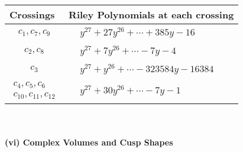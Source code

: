\documentclass[1p]{elsarticle_modified}
\theoremstyle{definition}
\begin{document}
\begin{tabular}{m{50pt}|m{274pt}}
Crossings & \hspace{64pt}Riley Polynomials at each crossing \\
\hline $$\begin{aligned}c_{1},c_{7},c_{9}\end{aligned}$$&$\begin{aligned}
&y^{27}+27 y^{26}+\cdots+385 y-16
\end{aligned}$\\
\hline $$\begin{aligned}c_{2},c_{8}\end{aligned}$$&$\begin{aligned}
&y^{27}+7 y^{26}+\cdots-7 y-4
\end{aligned}$\\
\hline $$\begin{aligned}c_{3}\end{aligned}$$&$\begin{aligned}
&y^{27}+y^{26}+\cdots-323584 y-16384
\end{aligned}$\\
\hline $$\begin{aligned}c_{4},c_{5},c_{6}\\c_{10},c_{11},c_{12}\end{aligned}$$&$\begin{aligned}
&y^{27}+30 y^{26}+\cdots-7 y-1
\end{aligned}$\\
\hline
\end{tabular}\\~\\
\newpage\flushleft \textbf{(vi) Complex Volumes and Cusp Shapes}
\end{document}
